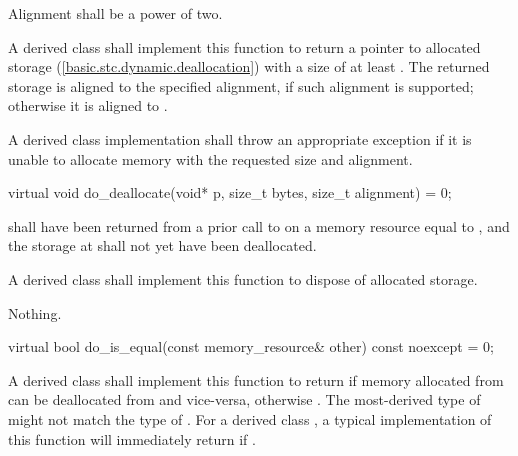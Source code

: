 \begin{itemdescr}
\pnum
\requires
Alignment shall be a power of two.

\pnum
\returns
A derived class shall implement this function to return a pointer to allocated storage (\ref{basic.stc.dynamic.deallocation}) with a size of at least .
The returned storage is aligned to the specified alignment, if such alignment is supported;
otherwise it is aligned to .

\pnum
\throws
A derived class implementation shall throw an appropriate exception if it is unable to allocate memory with the requested size and alignment.
\end{itemdescr}

%
%
\begin{itemdecl}
virtual void do_deallocate(void* p, size_t bytes, size_t alignment) = 0;
\end{itemdecl}

\begin{itemdescr}
\pnum
\requires
{} shall have been returned from a prior call to  on a memory resource equal to ,
and the storage at  shall not yet have been deallocated.

\pnum
\effects
A derived class shall implement this function to dispose of allocated storage.

\pnum
\throws
Nothing.
\end{itemdescr}

%
%
\begin{itemdecl}
virtual bool do_is_equal(const memory_resource& other) const noexcept = 0;
\end{itemdecl}

\begin{itemdescr}
\pnum
\returns
A derived class shall implement this function to return  if memory allocated from  can be deallocated from  and vice-versa,
otherwise .
\enternote
The most-derived type of  might not match the type of .
For a derived class , a typical implementation of this function
will immediately return 
if .\exitnote
\end{itemdescr}

